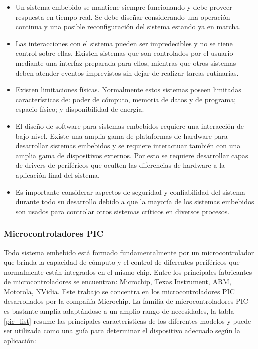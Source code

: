 \documentclass[11pt,letterpaper]{article}
\begin{document}
\begin{itemize}
	\item Un sistema embebido se mantiene siempre funcionando y debe proveer respuesta en tiempo real. Se debe diseñar considerando una operación continua y una posible reconfiguración del sistema estando ya en marcha.
	
	\item Las interacciones con el sistema pueden ser impredecibles y no se tiene control sobre ellas. Existen sistemas que son controlados por el usuario mediante una interfaz preparada para ellos, mientras que otros sistemas deben atender eventos imprevistos sin dejar de realizar tareas rutinarias.
	
	\item Existen limitaciones físicas. Normalmente estos sistemas poseen limitadas características de: poder de cómputo, memoria de datos y de programa; espacio físico; y disponibilidad de energía.
	
	\item El diseño de software para sistemas embebidos requiere una interacción de bajo nivel. Existe una amplia gama de plataformas de hardware para desarrollar sistemas embebidos y se requiere interactuar también con una amplia gama de dispositivos externos. Por esto se requiere desarrollar capas de drivers de periféricos que oculten las diferencias de hardware a la aplicación final del sistema.
	
	\item Es importante considerar aspectos de seguridad y confiabilidad del sistema durante todo su desarrollo debido a que la mayoría de los sistemas embebidos son usados para controlar otros sistemas críticos en diversos procesos.
\end{itemize}

\subsubsection{Microcontroladores PIC}

Todo sistema embebido está formado fundamentalmente por un microcontrolador que brinda la capacidad de cómputo y el control de diferentes periféricos que normalmente están integrados en el mismo chip. Entre los principales fabricantes de microcontroladores se encuentran: Microchip, Texas Instrument, ARM, Motorola, NVidia. Este trabajo se concentra en los microcontroladores PIC desarrollados por la compañía Microchip. La familia de microcontroladores  PIC es bastante amplia adaptándose a un amplio rango de necesidades, la tabla \ref{pic_list} resume las principales características de los diferentes modelos y puede ser utilizada como una guía para determinar el dispositivo adecuado según la aplicación:
\end{document}
